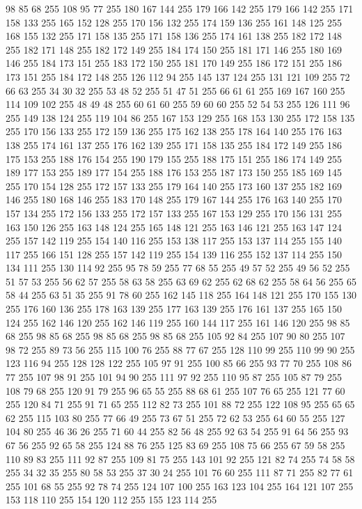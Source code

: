 98 85 68 255 108 95 77 255 180 167 144 255 179 166 142 255 179 166 142 255 171 158 133 255 165 152 128 255 170 156 132 255 174 159 136 255 161 148 125 255 168 155 132 255 171 158 135 255 171 158 136 255 174 161 138 255 182 172 148 255 182 171 148 255 182 172 149 255 184 174 150 255 181 171 146 255 180 169 146 255 184 173 151 255 183 172 150 255 181 170 149 255 186 172 151 255 186 173 151 255 184 172 148 255 126 112 94 255 145 137 124 255 131 121 109 255 72 66 63 255 34 30 32 255 53 48 52 255 51 47 51 255 66 61 61 255 169 167 160 255 114 109 102 255 48 49 48 255 60 61 60 255 59 60 60 255 52 54 53 255 126 111 96 255 149 138 124 255 119 104 86 255 167 153 129 255 168 153 130 255 172 158 135 255 170 156 133 255 172 159 136 255 175 162 138 255 178 164 140 255 176 163 138 255 174 161 137 255 176 162 139 255 171 158 135 255 184 172 149 255 186 175 153 255 188 176 154 255 190 179 155 255 188 175 151 255 186 174 149 255 189 177 153 255 189 177 154 255 188 176 153 255 187 173 150 255
185 169 145 255 170 154 128 255 172 157 133 255 179 164 140 255 173 160 137 255 182 169 146 255 180 168 146 255 183 170 148 255 179 167 144 255 176 163 140 255 170 157 134 255 172 156 133 255 172 157 133 255 167 153 129 255 170 156 131 255 163 150 126 255 163 148 124 255 165 148 121 255 163 146 121 255 163 147 124 255 157 142 119 255 154 140 116 255 153 138 117 255 153 137 114 255 155 140 117 255 166 151 128 255 157 142 119 255 154 139 116 255 152 137 114 255 150 134 111 255 130 114 92 255 95 78 59 255 77 68 55 255 49 57 52 255 49 56 52 255 51 57 53 255 56 62 57 255 58 63 58 255 63 69 62 255 62 68 62 255 58 64 56 255 65 58 44 255 63 51 35 255 91 78 60 255 162 145 118 255 164 148 121 255 170 155 130 255 176 160 136 255 178 163 139 255 177 163 139 255 176 161 137 255 165 150 124 255 162 146 120 255 162 146 119 255 160 144 117 255 161 146 120 255 98 85 68 255 98 85 68 255 98 85 68 255 98 85 68 255 105 92 84 255 107 90 80 255 107 98 72 255 89 73 56 255
115 100 76 255 88 77 67 255 128 110 99 255 110 99 90 255 123 116 94 255 128 128 122 255 105 97 91 255 100 85 66 255 93 77 70 255 108 86 77 255 107 98 91 255 101 94 90 255 111 97 92 255 110 95 87 255 105 87 79 255 108 79 68 255 120 91 79 255 96 65 55 255 88 68 61 255 107 76 65 255 121 77 60 255 120 84 71 255 91 71 65 255 112 82 73 255 101 88 72 255 122 108 95 255 65 65 62 255 115 103 80 255 77 66 49 255 73 67 51 255 72 62 53 255 64 60 55 255 127 104 80 255 46 36 26 255 71 60 44 255 82 56 48 255 92 63 54 255 91 64 56 255 93 67 56 255 92 65 58 255 124 88 76 255 125 83 69 255 108 75 66 255 67 59 58 255 110 89 83 255 111 92 87 255 109 81 75 255 143 101 92 255 121 82 74 255 74 58 58 255 34 32 35 255 80 58 53 255 37 30 24 255 101 76 60 255 111 87 71 255 82 77 61 255 101 68 55 255 92 78 74 255 124 107 100 255 163 123 104 255 164 121 107 255 153 118 110 255 154 120 112 255 155 123 114 255
